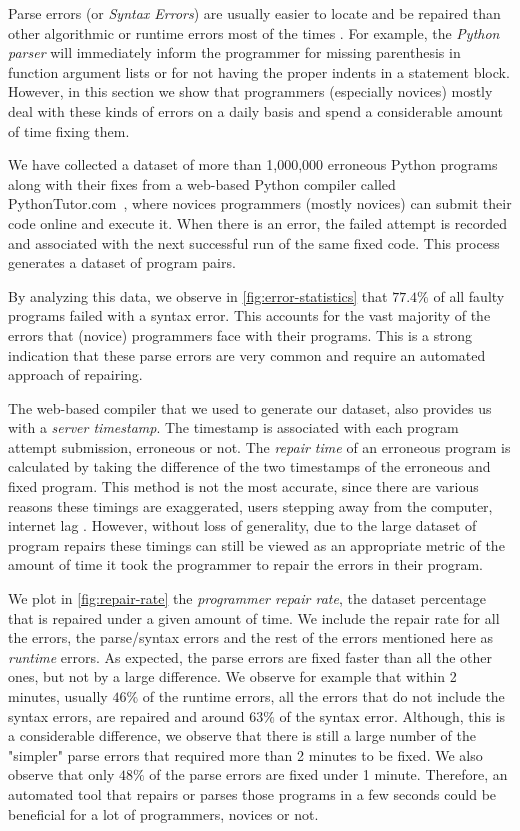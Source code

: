 Parse errors (or \emph{Syntax Errors}) are usually easier to locate and be
repaired than other algorithmic or runtime errors most of the times
\citep{Denny_2012}. For example, the \emph{Python parser} will immediately
inform the programmer for missing parenthesis in function argument lists or for
not having the proper indents in a statement block. However, in this section we
show that programmers (especially novices) mostly deal with these kinds of
errors on a daily basis and spend a considerable amount of time fixing them.

We have collected a dataset of more than 1,000,000 erroneous Python programs
along with their fixes from a web-based Python compiler called
PythonTutor.com~\citep{Guo2013}, where novices programmers (mostly novices) can
submit their code online and execute it. When there is an error, the failed
attempt is recorded and associated with the next successful run of the same
fixed code. This process generates a dataset of program pairs.

By analyzing this data, we observe in \autoref{fig:error-statistics} that $77.4
\% $ of all faulty programs failed with a syntax error. This accounts for the
vast majority of the errors that (novice) programmers face with their programs.
This is a strong indication that these parse errors are very common and require
an automated approach of repairing.

The web-based compiler that we used to generate our dataset, also provides us
with a \emph{server timestamp}. The timestamp is associated with each program
attempt submission, erroneous or not. The \emph{repair time} of an erroneous
program is calculated by taking the difference of the two timestamps of the
erroneous and fixed program. This method is not the most accurate, since there
are various reasons these timings are exaggerated, \eg users stepping away from
the computer, internet lag \etc. However, without loss of generality, due to the
large dataset of program repairs these timings can still be viewed as an
appropriate metric of the amount of time it took the programmer to repair the
errors in their program.

We plot in \autoref{fig:repair-rate} the \emph{programmer repair rate}, \ie the
dataset percentage that is repaired under a given amount of time. We include the
repair rate for all the errors, the parse/syntax errors and the rest of the
errors mentioned here as \emph{runtime} errors. As expected, the parse errors
are fixed faster than all the other ones, but not by a large difference. We
observe for example that within 2 minutes, usually $46\%$ of the runtime
errors, \ie all the errors that do not include the syntax errors, are repaired
and around $63\%$ of the syntax error. Although, this is a considerable
difference, we observe that there is still a large number of the "simpler" parse
errors that required more than 2 minutes to be fixed. We also observe that only
$48\%$ of the parse errors are fixed under 1 minute. Therefore, an automated
tool that repairs or parses those programs in a few seconds could be beneficial
for a lot of programmers, novices or not.

